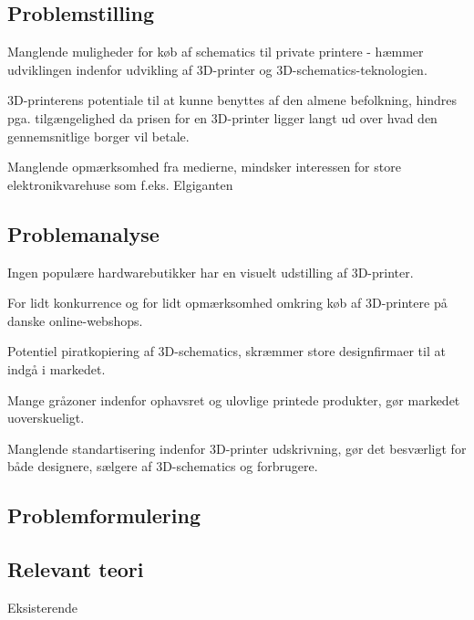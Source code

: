 \subsection{Problemstilling} %
\label{sub:problemstilling}

Manglende muligheder for køb af schematics til private printere - hæmmer udviklingen indenfor udvikling af 3D-printer og 3D-schematics-teknologien.

3D-printerens potentiale til at kunne benyttes af den almene befolkning, hindres pga. tilgængelighed da prisen for en 3D-printer ligger langt ud over hvad den gennemsnitlige borger vil betale.

Manglende opmærksomhed fra medierne, mindsker interessen for store elektronikvarehuse som f.eks. Elgiganten



\subsection{Problemanalyse} %
\label{sub:problemanalyse}

Ingen populære hardwarebutikker har en visuelt udstilling af 3D-printer.

For lidt konkurrence og for lidt opmærksomhed omkring køb af 3D-printere på danske online-webshops.

Potentiel piratkopiering af 3D-schematics, skræmmer store designfirmaer til at indgå i markedet.

Mange gråzoner indenfor ophavsret og ulovlige printede produkter, gør markedet uoverskueligt.

Manglende standartisering indenfor 3D-printer udskrivning, gør det besværligt for både designere, sælgere af 3D-schematics og forbrugere.



\subsection{Problemformulering} %
\label{sub:problemformulering}







\subsection{Relevant teori} %
\label{sub:relevant_teori}

Eksisterende


